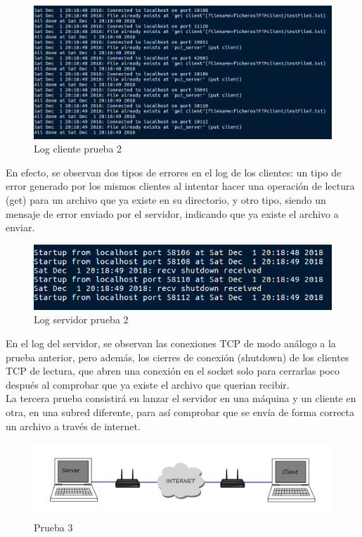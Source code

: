 \documentclass[journal, a4paper]{IEEEtran}
\begin{document}
\begin{figure}[H]
\centering
\includegraphics[scale=0.4]{images/log_cliente_prueba_2}
\caption{Log cliente prueba 2}
\end{figure}

En efecto, se observan dos tipos de errores en el log de los clientes: un tipo de error generado por los mismos clientes al intentar  hacer una operación de lectura (get) para un archivo que ya existe en su directorio, y otro tipo, siendo un mensaje de error enviado por el servidor, indicando que ya existe el archivo a enviar.

\begin{figure}[H]
\centering
\includegraphics[scale=0.6]{images/log_server_prueba_2}
\caption{Log servidor prueba 2}
\end{figure}

En el log del servidor, se observan las conexiones TCP de modo análogo a la prueba anterior, pero además, los cierres de conexión (shutdown) de los clientes TCP de lectura, que abren una conexión en el socket solo para cerrarlas poco después al comprobar que ya existe el archivo que querian recibir.\\

La tercera prueba consistirá en lanzar el servidor en una máquina y un cliente en otra, en una subred diferente, para así comprobar que se envía de forma correcta un archivo a través de internet.

\begin{figure}[H]
\centering
\includegraphics[scale=0.13]{images/cloud}
\caption{Prueba 3}
\end{figure}
\end{document}
